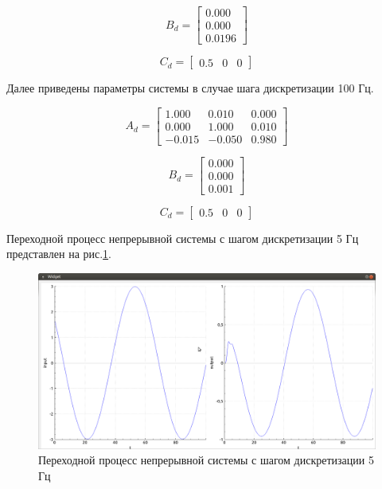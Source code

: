 \documentclass[14pt,a4paper]{extreport}
\begin{document}
\begin{equation}
    B_{d} = 
    \begin{bmatrix} 
        0.000 \\ 
        0.000 \\
        0.0196
    \end{bmatrix}
\end{equation}

\begin{equation}
    C_{d} = 
    \begin{bmatrix} 
        0.5 & 0 & 0
    \end{bmatrix}
\end{equation}

Далее приведены параметры системы в случае шага дискретизации 100 Гц.

\begin{equation}
    A_{d} = 
    \begin{bmatrix} 
        1.000 & 0.010 & 0.000 \\ 
        0.000 & 1.000 & 0.010 \\
        -0.015 & -0.050 & 0.980
    \end{bmatrix}
\end{equation}

\begin{equation}
    B_{d} = 
    \begin{bmatrix} 
        0.000 \\ 
        0.000 \\
        0.001
    \end{bmatrix}
\end{equation}

\begin{equation}
    C_{d} = 
    \begin{bmatrix} 
        0.5 & 0 & 0
    \end{bmatrix}
\end{equation}

Переходной процесс непрерывной системы с шагом дискретизации 
5 Гц представлен на рис.\ref{fig:con_5hz}.
\begin{figure}[H]
    \centering
    \includegraphics[width=160mm]{img/con_5hz.png}
    \caption{Переходной процесс непрерывной системы с шагом дискретизации 5 Гц}
    \label{fig:con_5hz}
\end{figure}
\end{document}
